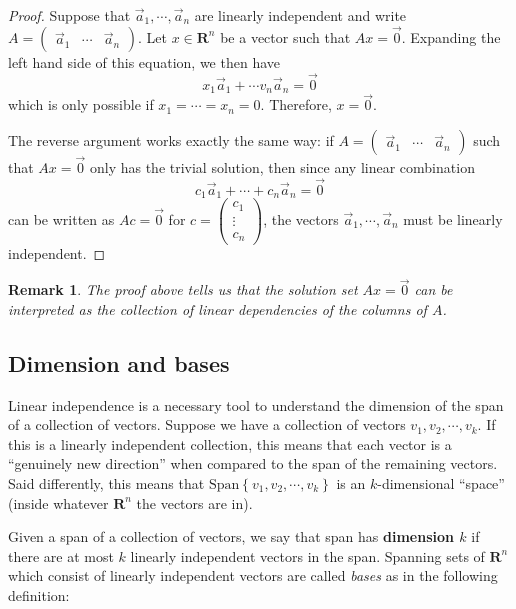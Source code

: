 \documentclass[12pt]{article}
\numberwithin{equation}{subsection}
\numberwithin{figure}{subsection}
\theoremstyle{note}
\newtheorem{remark}[subsection]{Remark}
\newcommand\Span[1]{\mathrm{Span}\left\{#1\right\}}
\begin{document}
\begin{proof}
Suppose that $\vec{a}_1,\cdots,\vec{a}_n$ are linearly independent and write $A=\begin{pmatrix} \vec{a}_1 & \cdots & \vec{a}_n\end{pmatrix}$. Let $x\in \mathbf{R}^n$ be a vector such that $Ax=\vec{0}$. Expanding the left hand side of this equation, we then have \[x_1\vec{a}_1 + \cdots v_n \vec{a}_n =\vec{0}\] which is only possible if $x_1=\cdots=x_n=0$. Therefore, $x=\vec{0}$. 

The reverse argument works exactly the same way: if $A=\begin{pmatrix} \vec{a}_1 & \cdots & \vec{a}_n\end{pmatrix}$ such that $Ax=\vec{0}$ only has the trivial solution, then since any linear combination \[ c_1 \vec{a}_1 +\cdots+c_n\vec{a}_n=\vec{0}\] can be written as $Ac=\vec{0}$ for $c=\begin{pmatrix} c_1 \\ \vdots \\ c_n\end{pmatrix}$, the vectors $\vec{a}_1,\cdots,\vec{a}_n$ must be linearly independent. 
\end{proof}

\begin{remark}
	The proof above tells us that the solution set $Ax=\vec{0}$ can be interpreted as the collection of linear dependencies of the columns of $A$. 	
\end{remark}

\subsection{Dimension and bases}

Linear independence is a necessary tool to understand the dimension of the span of a collection of vectors. Suppose we have a collection of vectors $v_1,v_2,\cdots, v_k$. If this is a linearly independent collection, this means that each vector is a ``genuinely new direction'' when compared to the span of the remaining vectors. Said differently, this means that $\Span{v_1,v_2,\cdots,v_k}$ is an $k$-dimensional ``space'' (inside whatever $\mathbf{R}^n$ the vectors are in). 

Given a span of a collection of vectors, we say that span has \textbf{dimension $k$} if there are at most $k$ linearly independent vectors in the span. Spanning sets of $\mathbf{R}^n$ which consist of linearly independent vectors are called \textit{bases} as in the following definition:
\end{document}
